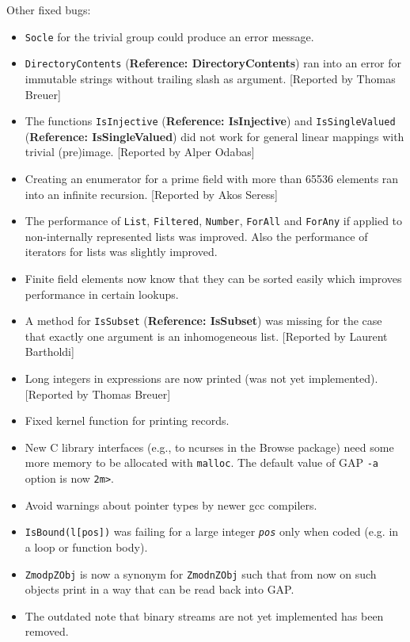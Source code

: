 \documentclass[a4paper,11pt]{report}
\begin{document}
{{ Other fixed bugs: 
\begin{itemize}
\item  \texttt{Socle} for the trivial group could produce an error message. 
\item  \texttt{DirectoryContents} (\textbf{Reference: DirectoryContents}) ran into an error for immutable strings without trailing slash as argument.
[Reported by Thomas Breuer] 
\item  The functions \texttt{IsInjective} (\textbf{Reference: IsInjective}) and \texttt{IsSingleValued} (\textbf{Reference: IsSingleValued}) did not work for general linear mappings with trivial (pre)image. [Reported by
Alper Odabas] 
\item  Creating an enumerator for a prime field with more than 65536 elements ran
into an infinite recursion. [Reported by Akos Seress] 
\item  The performance of \texttt{List}, \texttt{Filtered}, \texttt{Number}, \texttt{ForAll} and \texttt{ForAny} if applied to non-internally represented lists was improved. Also the
performance of iterators for lists was slightly improved. 
\item  Finite field elements now know that they can be sorted easily which improves
performance in certain lookups. 
\item  A method for \texttt{IsSubset} (\textbf{Reference: IsSubset}) was missing for the case that exactly one argument is an inhomogeneous list.
[Reported by Laurent Bartholdi] 
\item  Long integers in expressions are now printed (was not yet implemented).
[Reported by Thomas Breuer] 
\item  Fixed kernel function for printing records. 
\item  New C library interfaces (e.g., to ncurses in the \textsf{Browse} package) need some more memory to be allocated with \texttt{malloc}. The default value of \textsf{GAP} \texttt{-a} option is now \texttt{2m{\textgreater}}. 
\item  Avoid warnings about pointer types by newer gcc compilers. 
\item  \texttt{IsBound(l[pos])} was failing for a large integer \mbox{\texttt{\mdseries\slshape pos}} only when coded (e.g. in a loop or function body). 
\item  \texttt{ZmodpZObj} is now a synonym for \texttt{ZmodnZObj} such that from now on such objects print in a way that can be read back into \textsf{GAP}. 
\item  The outdated note that binary streams are not yet implemented has been
removed. 
\end{itemize}
 }

}
\end{document}
